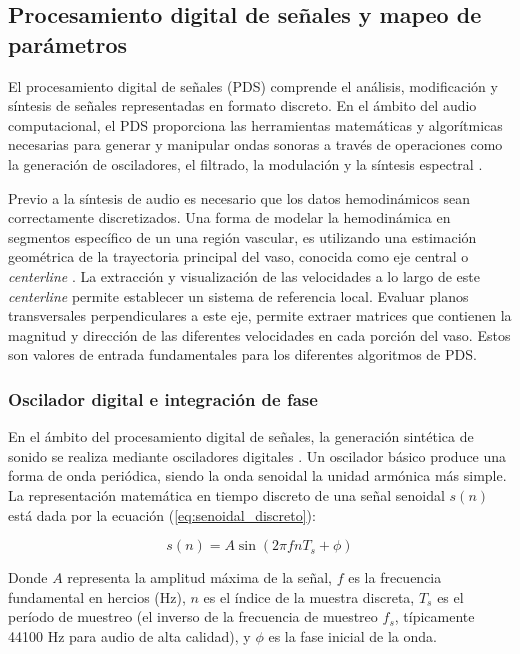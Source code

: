 \subsection{Procesamiento digital de señales y mapeo de parámetros}

El procesamiento digital de señales (PDS) comprende el análisis, modificación y síntesis de señales representadas en formato discreto. En el ámbito del audio computacional, el PDS proporciona las herramientas matemáticas y algorítmicas necesarias para generar y manipular ondas sonoras a través de operaciones como la generación de osciladores, el filtrado, la modulación y la síntesis espectral \cite{dePoli1983,Moorer1977}.

Previo a la síntesis de audio es necesario que los datos hemodinámicos sean correctamente discretizados. Una forma de modelar la hemodinámica en segmentos específico de un una región vascular, es utilizando una estimación geométrica de la trayectoria principal del vaso, conocida como eje central o \textit{centerline} \cite{Antiga2008}. La extracción y visualización de las velocidades a lo largo de este \textit{centerline} permite establecer un sistema de referencia local. Evaluar planos transversales perpendiculares a este eje, permite extraer matrices que contienen la magnitud y dirección de las diferentes velocidades en cada porción del vaso. Estos son valores de entrada fundamentales para los diferentes algoritmos de PDS.

\subsubsection{Oscilador digital e integración de fase}\label{subsection:integracion_fase}

En el ámbito del procesamiento digital de señales, la generación sintética de sonido se realiza mediante osciladores digitales \cite{tierney1971digital}. Un oscilador básico produce una forma de onda periódica, siendo la onda senoidal la unidad armónica más simple. La representación matemática en tiempo discreto de una señal senoidal $s(n)$ está dada por la ecuación (\ref{eq:senoidal_discreto}):

\begin{equation}    
    s(n) = A \sin(2\pi f n T_s + \phi) 
    \label{eq:senoidal_discreto}
\end{equation}

Donde $A$ representa la amplitud máxima de la señal, $f$ es la frecuencia fundamental en hercios (Hz), $n$ es el índice de la muestra discreta, $T_s$ es el período de muestreo (el inverso de la frecuencia de muestreo $f_s$, típicamente 44100 Hz para audio de alta calidad), y $\phi$ es la fase inicial de la onda.

